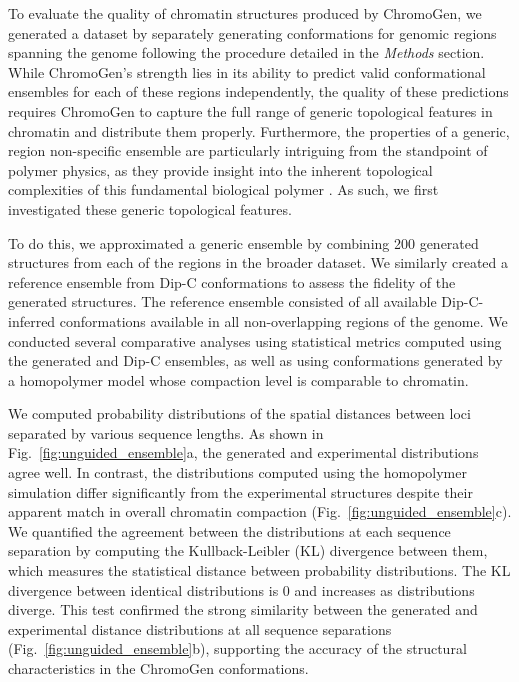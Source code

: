 \documentclass[12pt,letterpaper]{article}
\begin{document}
To evaluate the quality of chromatin structures produced by ChromoGen, we generated a dataset by separately generating conformations for genomic regions spanning the genome following the procedure detailed in the \emph{Methods} section. 
While ChromoGen's strength lies in its ability to predict valid conformational ensembles for each of these regions independently, the quality of these predictions requires ChromoGen to capture the full range of generic topological features in chromatin and distribute them properly. 
Furthermore, the properties of a generic, region non-specific ensemble are particularly intriguing from the standpoint of polymer physics, as they provide insight into the inherent topological complexities of this fundamental biological polymer \cite{Gro93,Lie09}.
As such, we first investigated these generic topological features. 

To do this, we approximated a generic ensemble by combining 200 generated structures from each of the regions in the broader dataset. 
We similarly created a reference ensemble from Dip-C conformations to assess the fidelity of the generated structures. 
The reference ensemble consisted of all available Dip-C-inferred conformations available in all non-overlapping regions of the genome. 
We conducted several comparative analyses using statistical metrics computed using the generated and Dip-C ensembles, as well as using conformations generated by a homopolymer model whose compaction level is comparable to chromatin. 

We computed probability distributions of the spatial distances between loci separated by various sequence lengths. %
As shown in Fig.~\ref{fig:unguided_ensemble}a, the generated and experimental distributions agree well. In contrast, the distributions computed using the homopolymer simulation differ significantly from the experimental structures despite their apparent match in overall chromatin compaction (Fig.~\ref{fig:unguided_ensemble}c). %
We quantified the agreement between the distributions at each sequence separation by computing the  Kullback-Leibler (KL) divergence between them, which measures the statistical distance between probability distributions. 
The KL divergence between identical distributions is 0 and increases as distributions diverge. This test confirmed the strong similarity between the generated and experimental distance distributions at all sequence separations (Fig.~\ref{fig:unguided_ensemble}b), supporting the accuracy of the structural characteristics in the ChromoGen conformations.
\end{document}
